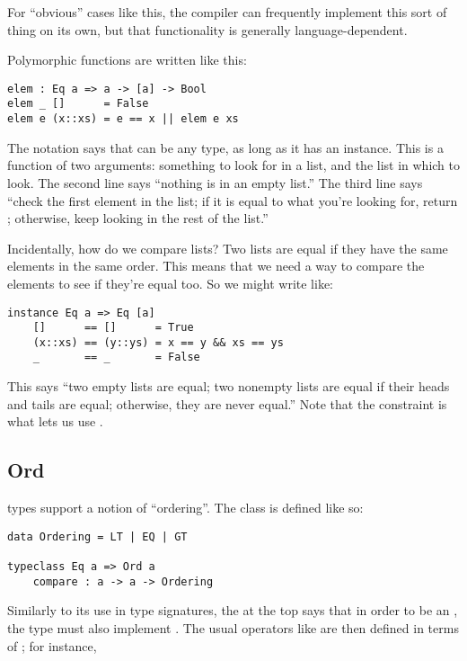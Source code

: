 \noindent For ``obvious'' cases like this, the compiler can frequently implement this sort of thing on its own, but that functionality is generally language-dependent.

Polymorphic functions are written like this:

\begin{lstlisting}[language=pseudoml]
elem : Eq a => a -> [a] -> Bool
elem _ []      = False
elem e (x::xs) = e == x || elem e xs
\end{lstlisting}

The \mlil{=>} notation says that  can be any type, as long as it has an  instance. This is a function of two arguments: something to look for in a list, and the list in which to look. The second line says ``nothing is in an empty list.'' The third line says ``check the first element in the list; if it is equal to what you're looking for, return ; otherwise, keep looking in the rest of the list.''

Incidentally, how do we compare lists? Two lists are equal if they have the same elements in the same order. This means that we need a way to compare the elements to see if they're equal too. So we might write  like:

\begin{lstlisting}[language=pseudoml]
instance Eq a => Eq [a]
    []      == []      = True
    (x::xs) == (y::ys) = x == y && xs == ys
    _       == _       = False
\end{lstlisting}

\noindent This says ``two empty lists are equal; two nonempty lists are equal if their heads and tails are equal; otherwise, they are never equal.'' Note that the  constraint is what lets us use .

\subsection{Ord}

 types support a notion of ``ordering''. The class is defined like so:

\begin{lstlisting}[language=pseudoml]
data Ordering = LT | EQ | GT

typeclass Eq a => Ord a
    compare : a -> a -> Ordering
\end{lstlisting}

Similarly to its use in type signatures, the \mlil{=>} at the top says that in order to be an , the type must also implement . The usual operators like \mlil{<} are then defined in terms of ; for instance,

